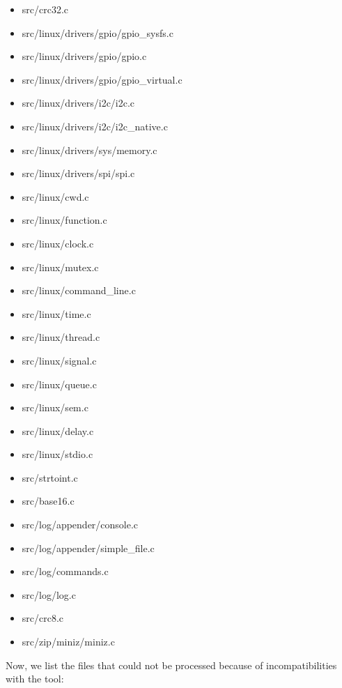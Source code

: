 \begin{itemize}
\item src/crc32.c
\item src/linux/drivers/gpio/gpio\_sysfs.c
\item src/linux/drivers/gpio/gpio.c
\item src/linux/drivers/gpio/gpio\_virtual.c
\item src/linux/drivers/i2c/i2c.c
\item src/linux/drivers/i2c/i2c\_native.c
\item src/linux/drivers/sys/memory.c
\item src/linux/drivers/spi/spi.c
\item src/linux/cwd.c
\item src/linux/function.c
\item src/linux/clock.c
\item src/linux/mutex.c
\item src/linux/command\_line.c
\item src/linux/time.c
\item src/linux/thread.c
\item src/linux/signal.c
\item src/linux/queue.c
\item src/linux/sem.c
\item src/linux/delay.c
\item src/linux/stdio.c
\item src/strtoint.c
\item src/base16.c
\item src/log/appender/console.c
\item src/log/appender/simple\_file.c
\item src/log/commands.c
\item src/log/log.c
\item src/crc8.c
\item src/zip/miniz/miniz.c
\end{itemize}

Now, we list the files that could not be processed because of incompatibilities with the tool:

